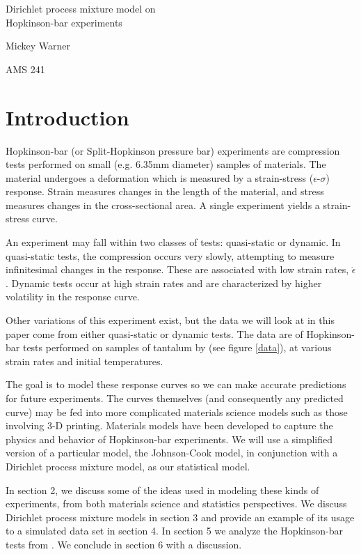 \documentclass[12pt]{article}
\begin{document}
\begin{LARGE}
\noindent Dirichlet process mixture model on \\ Hopkinson-bar experiments
\end{LARGE}
\bigskip

\noindent Mickey Warner

\noindent AMS 241

\section{Introduction}

Hopkinson-bar (or Split-Hopkinson pressure bar) experiments are compression tests performed on small (e.g. 6.35mm diameter) samples of materials. The material undergoes a deformation which is measured by a strain-stress ($\epsilon$-$\sigma$) response. Strain measures changes in the length of the material, and stress measures changes in the cross-sectional area. A single experiment yields a strain-stress curve.

An experiment may fall within two classes of tests: quasi-static or dynamic. In quasi-static tests, the compression occurs very slowly, attempting to measure infinitesimal changes in the response. These are associated with low strain rates, $\dot\epsilon$. Dynamic tests occur at high strain rates and are characterized by higher volatility in the response curve.

Other variations of this experiment exist, but the data we will look at in this paper come from either quasi-static or dynamic tests. The data are of Hopkinson-bar tests performed on samples of tantalum by \cite{chen1996constitutive} (see figure \ref{data}), at various strain rates and initial temperatures.

The goal is to model these response curves so we can make accurate predictions for future experiments. The curves themselves (and consequently any predicted curve) may be fed into more complicated materials science models such as those involving 3-D printing. Materials models have been developed to capture the physics and behavior of Hopkinson-bar experiments. We will use a simplified version of a particular model, the Johnson-Cook model, in conjunction with a Dirichlet process mixture model, as our statistical model.

In section 2, we discuss some of the ideas used in modeling these kinds of experiments, from both materials science and statistics perspectives. We discuss Dirichlet process mixture models in section 3 and provide an example of its usage to a simulated data set in section 4. In section 5 we analyze the Hopkinson-bar tests from \cite{chen1996constitutive}. We conclude in section 6 with a discussion.
\end{document}
